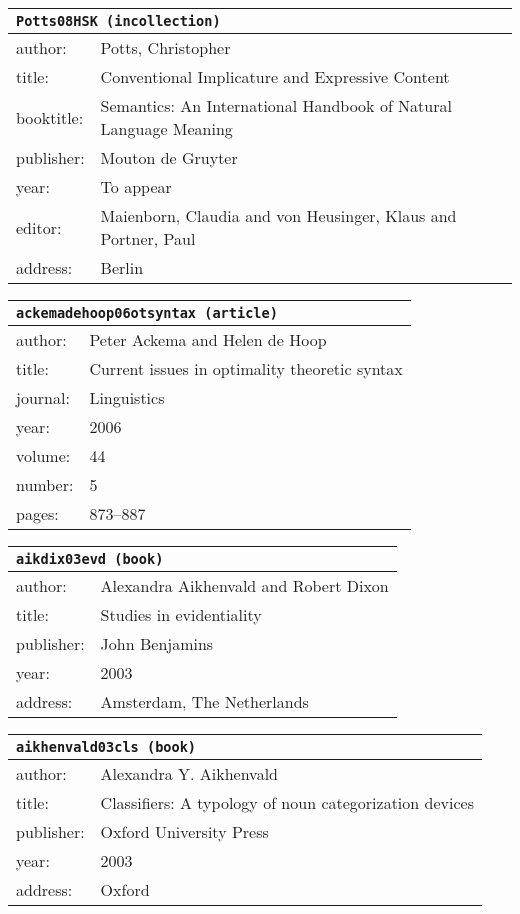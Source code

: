 \documentclass{article}
\begin{document}
\bigskip

\begin{tabular}{p{}p{}}
\multicolumn{2}{l}{\texttt{Potts08HSK (incollection)}}\\
\hline
author: & Potts, Christopher\\
title: & Conventional Implicature and Expressive Content\\
booktitle: & Semantics: An International Handbook of Natural Language Meaning\\
publisher: & Mouton de Gruyter\\
year: & To appear\\
editor: & Maienborn, Claudia and von Heusinger, Klaus and Portner, Paul\\
address: & Berlin\\
\end{tabular}

\bigskip

\begin{tabular}{p{}p{}}
\multicolumn{2}{l}{\texttt{ackemadehoop06otsyntax (article)}}\\
\hline
author: & Peter Ackema and Helen {de Hoop}\\
title: & Current issues in optimality theoretic syntax\\
journal: & Linguistics\\
year: & 2006\\
volume: & 44\\
number: & 5\\
pages: & 873--887\\
\end{tabular}

\bigskip

\begin{tabular}{p{}p{}}
\multicolumn{2}{l}{\texttt{aikdix03evd (book)}}\\
\hline
author: & Alexandra Aikhenvald and Robert Dixon\\
title: & Studies in evidentiality\\
publisher: & John Benjamins\\
year: & 2003\\
address: & Amsterdam, The Netherlands\\
\end{tabular}

\bigskip

\begin{tabular}{p{}p{}}
\multicolumn{2}{l}{\texttt{aikhenvald03cls (book)}}\\
\hline
author: & Alexandra Y. Aikhenvald\\
title: & Classifiers: A typology of noun categorization devices\\
publisher: & Oxford University Press\\
year: & 2003\\
address: & Oxford\\
\end{tabular}
\end{document}
